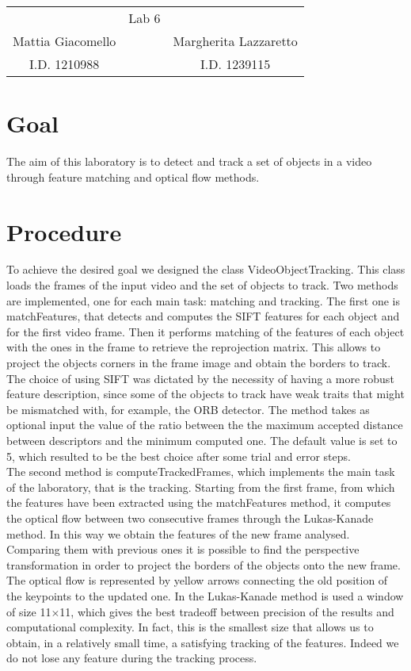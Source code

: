 \documentclass[12pt,a4paper]{article}
\newcommand{\cc}{\fontfamily{txtt}\selectfont}
\begin{document}
\begin{center}
\begin{tabular}{c c c}
	&\LARGE{Lab 6}&\\
		\large{Mattia Giacomello}& &\large{Margherita Lazzaretto}\\
		I.D. 1210988& &I.D. 1239115
\end{tabular}
\end{center}

\section{Goal}
The aim of this laboratory is to detect and track a set of objects in a video through feature matching and optical flow methods.

\section{Procedure}
To achieve the desired goal we designed the class {\cc VideoObjectTracking}.
This class loads the frames of the input video and the set of objects to track.
Two methods are implemented, one for each main task: matching and tracking.\newline
The first one is {\cc matchFeatures}, that detects and computes the SIFT features for each object and for the first video frame. 
Then it performs matching of the features of each object with the ones in the frame to retrieve the reprojection matrix.
This allows to project the objects corners in the frame image and obtain the borders to track.
The choice of using SIFT was dictated by the necessity of having a more robust feature description, since some of the objects to track have weak traits that might be mismatched with, for example, the ORB detector.
The method takes as optional input the value of the ratio between the the maximum accepted distance between descriptors and the minimum computed one.
The default value is set to 5, which resulted to be the best choice after some trial and error steps. \\
The second method is {\cc computeTrackedFrames}, which implements the main task of the laboratory, that is the tracking. Starting from the first frame, from which the features have been extracted using the {\cc matchFeatures} method, it computes the optical flow between two consecutive frames through the Lukas-Kanade method. In this way we obtain the features of the new frame analysed. Comparing them with previous ones it is possible to find the perspective transformation in order to project the borders of the objects onto the new frame. The optical flow is represented by yellow arrows connecting the old position of the keypoints to the updated one. In the Lukas-Kanade method is used a window of size 11$\times$11, which gives the best tradeoff between precision of the results and computational complexity.  In fact, this is the smallest size that allows us to obtain, in a relatively small time, a satisfying tracking of the features. Indeed we do not lose any feature during the tracking process. \\
\end{document}
